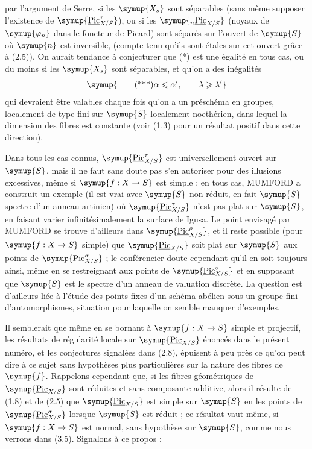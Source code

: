 par l'argument de Serre, si les $\symup{X_s}$ sont séparables (sans même supposer
l'existence de $\symup{\underline{\operatorname{Pic}}_{X/S}^\tau}$), ou si les
$\symup{{}_n\underline{\operatorname{Pic}}_{X/S}}$ (noyaux de $\symup{\varphi_n}$ dans le foncteur de
Picard) sont \uline{séparés} sur l'ouvert de $\symup{S}$ où $\symup{n}$ est inversible, (compte tenu
qu'ils sont étales sur cet ouvert grâce à (2.5)). On aurait tendance à conjecturer que (*) est une égalité en tous cas,
ou du moins si les $\symup{X_s}$ sont séparables, et qu'on a des inégalités
\[
\symup{\tag{***}\alpha\leqslant\alpha',\qquad\lambda\geqslant\lambda'}
\]
qui devraient être valables chaque fois qu'on a un préschéma en groupes,
localement de type fini sur $\symup{S}$ localement noethérien, dans lequel la dimension
des fibres est constante (voir (1.3) pour un résultat positif dans cette
direction).

 Dans tous les cas connus,
$\symup{\underline{\operatorname{Pic}}_{X/S}^\tau}$ est universellement ouvert sur $\symup{S}$, mais il ne
faut sans doute pas s'en autoriser pour des illusions excessives, même si
$\symup{f:X\to S}$ est simple ; en tous cas, MUMFORD a construit un
exemple (il est vrai avec $\symup{S}$ non réduit, en fait $\symup{S}$ spectre d'un anneau
artinien) où $\symup{\underline{\operatorname{Pic}}_{X/S}^\tau}$ n'est pas plat sur $\symup{S}$, en faisant
varier infinitésimalement la surface de Igusa. Le point envisagé par MUMFORD se
trouve d'ailleurs dans $\symup{\underline{\operatorname{Pic}}_{X/S}^\rho}$, et il reste possible
(pour $\symup{f:X\to S}$ simple) que $\symup{\underline{\operatorname{Pic}}_{X/S}}$ soit
plat sur $\symup{S}$ aux points de $\symup{\underline{\operatorname{Pic}}_{X/S}^\sigma}$ ; le conférencier
doute cependant qu'il en soit toujours ainsi, même en se restreignant aux
points de $\symup{\underline{\operatorname{Pic}}_{X/S}^\circ}$ et en supposant que $\symup{S}$ est le
spectre d'un anneau de valuation discrète. La question est d'ailleurs liée à
l'étude des points fixes d'un schéma abélien sous un groupe fini
d'automorphismes, situation pour laquelle on semble manquer d'exemples.

Il semblerait que même en se bornant à $\symup{f:X\to S}$ simple et
projectif, les résultats de régularité locale sur $\symup{\underline{\operatorname{Pic}}_{X/S}}$
énoncés dans le présent numéro, et les conjectures signalées dans (2.8),
épuisent à peu près ce qu'on peut dire à ce sujet sans hypothèses plus
particulières sur la nature des fibres de $\symup{f}$. Rappelons cependant que, si les
fibres géométriques de $\symup{\underline{\operatorname{Pic}}_{X/S}}$ sont \uline{réduites} et sans
composante additive, alors il résulte de (1.8) et de (2.5) que
$\symup{\underline{\operatorname{Pic}}_{X/S}}$ est simple sur $\symup{S}$ en les points de
$\symup{\underline{\operatorname{Pic}}_{X/S}^\sigma}$ lorsque $\symup{S}$ est réduit ; ce résultat vaut
même, si $\symup{f:X\to S}$ est normal, sans hypothèse sur $\symup{S}$, comme nous
verrons dans (3.5). Signalons à ce propos :

